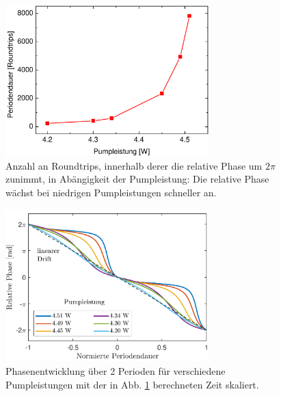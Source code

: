 \documentclass[bachelor,       %
               twoside,        %
               BCOR10mm,       %
               liststotoc,nomtotoc,bibtotoc, %
               english,ngerman, %
               final,          %
               ]{GAUBM}
\begin{document}
\begin{figure}
	\centering
	\includegraphics[width=0.7\textwidth]{figures/jumpRT.pdf}
	\caption{Anzahl an Roundtrips, innerhalb derer die relative Phase um $2\pi$ zunimmt, in Abängigkeit der Pumpleistung: Die relative Phase wächst bei niedrigen Pumpleistungen schneller an.}
   \label{fig:jumpRT}
\end{figure} 

\begin{figure}
	\centering
	\includegraphics[width=0.7\textwidth]{figures/steps_relativ4.pdf}
	\caption{Phasenentwicklung über 2 Perioden für verschiedene Pumpleistungen mit der in Abb. \ref{fig:jumpRT} berechneten Zeit skaliert.}
   \label{fig:165014steps2}
\end{figure}

\clearpage
\end{document}
